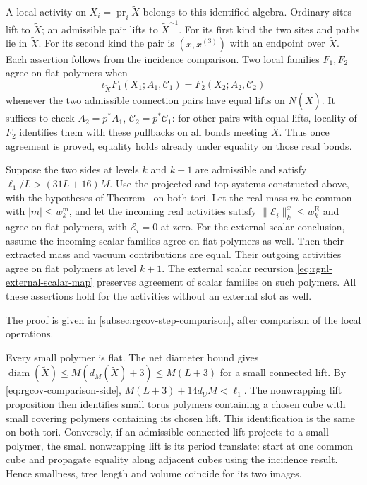 A local activity on $X_i=\operatorname{pr}_i\widetilde X$
belongs to this identified algebra. Ordinary sites
lift to $\widetilde X$; an admissible pair lifts
to $\widetilde X^{\sim1}$. For its first kind the
two sites and paths lie in $\widetilde X$.
For its second kind the pair is $(x,x^{(3)})$
with an endpoint over $\widetilde X$.
Each assertion follows from the incidence comparison.
Two local families $F_1,F_2$ agree on flat polymers
when
\begin{equation}\label{eq:rgcov-local-agreement}
 \iota_{\widetilde X}F_1(X_1;A_1,\mathscr C_1)
                             =F_2(X_2;A_2,\mathscr C_2)
\end{equation}
whenever the two admissible connection pairs have
equal lifts on $N(\widetilde X)$.
It suffices to check $A_2=p^*A_1$,
$\mathscr C_2=p^*\mathscr C_1$:
for other pairs with equal lifts, locality of
$F_2$ identifies them with these pullbacks on all
bonds meeting $\widetilde X$.
Thus once agreement is proved, equality holds
already under equality on those read bonds.

\begin{theorem}\label{thm:rgcov-step-comparison}
Suppose the two sides at levels $k$ and $k+1$ are
admissible and satisfy
$\ell_1/L>(31L+16)M$. Use the projected and top
systems constructed above, with the hypotheses of
Theorem~ on both tori.
Let the real mass $m$ be common with $|m|\le w_k^{\mathrm m}$,
and let the incoming real activities satisfy
$\|\mathscr E_i\|_k^x\le w_k^{\mathrm E}$ and agree on flat polymers,
with $\mathscr E_i=0$ at zero. For the external scalar conclusion,
assume the incoming scalar families agree on flat polymers as well.
Then their extracted mass and vacuum contributions
are equal. Their outgoing activities agree on flat
polymers at level $k+1$.
The external scalar recursion
\eqref{eq:rgnl-external-scalar-map} preserves agreement
of scalar families on such polymers.
All these assertions hold for the activities without
an external slot as well.
\end{theorem}

The proof is given in \cref{subsec:rgcov-step-comparison}, after
comparison of the local operations.

Every small polymer is flat. The net diameter bound
gives
$\operatorname{diam}(\widetilde X)
\le M(d_M(\widetilde X)+3)\le M(L+3)$ for a small
connected lift. By \eqref{eq:rgcov-comparison-side},
$M(L+3)+14d_UM<\ell_1$.
The nonwrapping lift proposition then identifies
small torus polymers containing a chosen cube
with small covering polymers containing its
chosen lift. This identification is the same
on both tori. Conversely, if an admissible
connected lift projects to a small polymer,
the small nonwrapping lift is its period translate:
start at one common cube and propagate equality
along adjacent cubes using the incidence result.
Hence smallness, tree length and volume coincide
for its two images.

